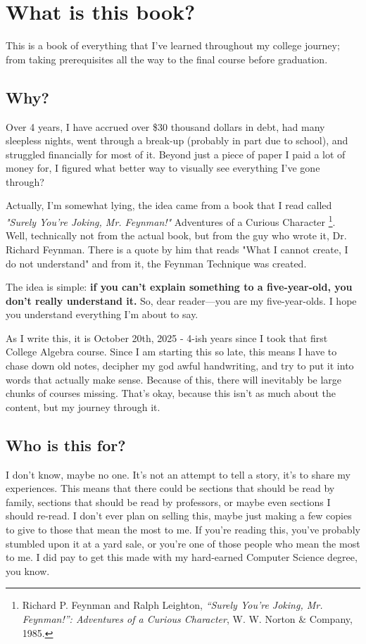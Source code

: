\section{What is this book?}
This is a book of everything that I've learned throughout my college journey; from taking
prerequisites all the way to the final course before graduation.
\subsection{Why?}
Over 4 years, I have accrued over \$30 thousand dollars in debt, had many sleepless nights,
went through a break-up (probably in part due to school), and struggled financially for most of it.
Beyond just a piece of paper I paid a lot of money for, I figured what better way
to visually see everything I've gone through?

Actually, I'm somewhat lying, the
idea came from a book that I read called
\textit{"Surely You're Joking, Mr. Feynman!"} Adventures of a Curious Character%
\footnote{Richard P. Feynman and Ralph Leighton,
\textit{“Surely You're Joking, Mr. Feynman!”: Adventures of a Curious Character},
W. W. Norton \& Company, 1985.}. Well, technically not from the actual book, but
from the guy who wrote it, Dr. Richard Feynman. There is a quote by him that reads
"What I cannot create, I do not understand" and from it, the Feynman Technique was created.

The idea is simple: \textbf{if you can’t explain something to a five-year-old, you don’t really understand it.}
So, dear reader—you are my five-year-olds. I hope you understand everything I’m about to say.

As I write this, it is October 20th, 2025 - 4-ish years since I took that first
College Algebra course. Since I am starting this so late, this means I have to
chase down old notes, decipher my god awful handwriting, and try to put it into
words that actually make sense. Because of this, there will inevitably be large
chunks of courses missing. That's okay, because this isn't as much about the content,
but my journey through it.


\subsection{Who is this for?}
I don't know, maybe no one. It's not an attempt to tell a story, it's to share my
experiences. This means that there could be sections that should be read by family,
sections that should be read by professors, or maybe even sections I should re-read.
I don't ever plan on selling this, maybe just making a few copies to give to those
that mean the most to me. If you're reading this, you've probably stumbled upon it
at a yard sale, or you're one of those people who mean the most to me. I did pay
to get this made with my hard-earned Computer Science degree, you know.

